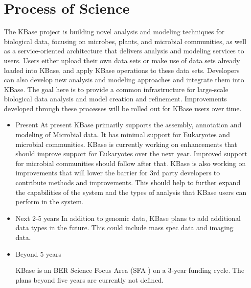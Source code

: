 \documentclass[10pt,a4paper]{report}
\begin{document}
\section{Process of Science}
The KBase project is building novel analysis and modeling techniques for biological data, 
focusing on microbes, plants, and microbial communities, as well as a 
service-oriented architecture that delivers analysis and modeling services to users. Users either upload 
their own data sets or make use of data sets already loaded into KBase, and apply KBase 
operations to these data sets.  Developers can also develop new analysis and modeling approaches and integrate them 
into KBase. The goal here is to provide a common infrastructure for 
large-scale biological data analysis and model creation and refinement. Improvements developed 
through these processes will be rolled out for KBase users over time.

\begin{itemize}
\item Present
At present KBase primarily supports the assembly, annotation and modeling of Microbial data.  It has minimal support for Eukaryotes and microbial communities.  KBase is currently working on enhancements that should improve support for Eukaryotes over the next year.  Improved support for microbial communities should follow after that.  KBase is also working on improvements that will lower the barrier for 3rd party developers to contribute methods and improvements.  This should help to further expand the capabilities of the system and the types of analysis that KBase users can perform in the system.

\item Next 2-5 years
In addition to genomic data, KBase plans to add additional data types in the future.  This could include mass spec data and imaging data.

\item Beyond 5 years

KBase is an BER Science Focus Area (SFA ) on a 3-year funding cycle.  The plans beyond five years are currently not defined.

\end{itemize}
\end{document}

